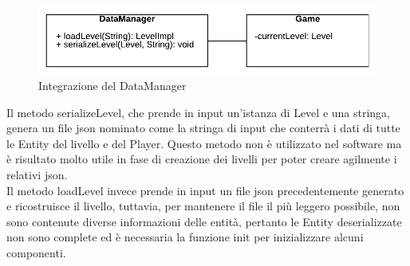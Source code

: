 \documentclass{article}
\begin{document}
\begin{figure}[ht]
    \includegraphics[width=1\textwidth]{images/DataManager.png}
    \caption{Integrazione del DataManager}
    \label{fig:datamanager}
\end{figure}

Il metodo serializeLevel, che prende in input un'istanza di Level e una stringa, genera un file json nominato come la stringa di input che conterrà i dati di tutte le Entity del livello e del Player. Questo metodo non è utilizzato nel software ma è risultato molto utile in fase di creazione dei livelli per poter creare agilmente i relativi json.\\
Il metodo loadLevel invece prende in input un file json precedentemente generato e ricostruisce il livello, tuttavia, per mantenere il file il più leggero possibile, non sono contenute diverse informazioni delle entità, pertanto le Entity deserializzate non sono complete ed è necessaria la funzione init per inizializzare alcuni componenti.
\end{document}
